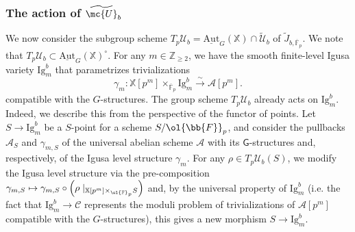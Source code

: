 \documentclass[letterpaper,11pt]{amsart}
\begin{document}

\subsubsection{The action of \texorpdfstring{$\widetilde{\mc{U}}_b$}{}}\label{subsub: Ub} We now consider the subgroup scheme $T_p\mathcal{U}_b = \underline{\mathrm{Aut}}_{G}(\mathbb{X})\cap \widetilde{\mathcal{U}}_b$ of $\widetilde{J}_{b,\overline{\mathbb{F}}_p}$. We note that $T_p\mathcal{U}_b\subset \underline{\mathrm{Aut}}_{G}(\mathbb{X})^\circ$. For any $m\in \mathbb{Z}_{\geq 2}$, we have the smooth finite-level Igusa variety $\mathrm{Ig}^b_m$ that parametrizes trivializations 
\[
\gamma_m: \mathbb{X}[p^m]\times_{\overline{\mathbb{F}}_p}\mathrm{Ig}^b_m \stackrel{\sim}{\to} \mathcal{A}[p^m].
\]
compatible with the $G$-structures.
The group scheme $T_p\mathcal{U}_b$ already acts on $\mathrm{Ig}^b_m$. Indeed, we describe this from the perspective of the functor of points. Let $S\to \mathrm{Ig}^b_m$ be a $S$-point for a scheme $S/\ol{\bb{F}}_{p}$, and consider the pullbacks $\mathcal{A}_S$ and $\gamma_{m,S}$ of the universal abelian scheme $\mathcal{A}$ with its $\mathsf{G}$-structures and, respectively, of the Igusa level structure $\gamma_m$. For any $\rho\in T_p\mathcal{U}_b(S)$, we modify the Igusa level structure via the pre-composition  $\gamma_{m,S} \mapsto \gamma_{m,S}\circ \left(\rho\mid_{\mathbb{X}[p^m]\times_{\ol{\mathbb{F}}_p}S}\right)$ and, by the universal property of $\mathrm{Ig}^b_m$ (i.e. the fact that $\mathrm{Ig}^b_m\to \mathscr{C}$ represents the moduli problem of trivializations of $\mathcal{A}[p^m]$ compatible with the $G$-structures), this gives a new morphism $S\to \mathrm{Ig}^b_m$. 
\end{document}
